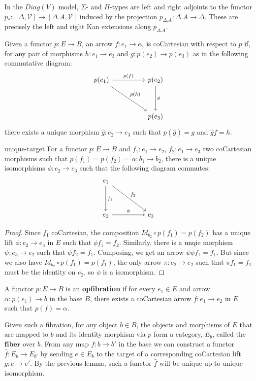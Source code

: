 \begin{rem}
In the $Diag(V)$ model, $\Sigma$- and $\Pi$-types are left and right adjoints to the functor $p_* : [\Delta, \mathcal{V}] \to [\Delta.A, \mathcal{V}]$ induced by the projection $p_{\Delta.A} : \Delta.A \to \Delta$. These are precisely the left and right Kan extensions along $p_{\Delta.A}$.
\end{rem}
\begin{defn}
Given a functor $p : E \to B$, an arrow $f : e_1 \to e_2$ is coCartesian with respect to $p$ if, for any pair of morphisms $h : e_1 \to e_3$ and $g : p(e_2) \to p(e_3)$ as in the following commutative diagram:
\[
\ti
p(e_1) \ar[r, "p(f)"] \ar[rd, "p(h)"] & p(e_2) \ar[d, "g"] \\
& p(e_3)
\kz
\]
there exists a unique morphism $\hat g : e_2 \to e_3$ such that $p(\hat g) = g$ and $\hat g f = h$.
\end{defn}
\begin{lem}{unique-target}
For a functor $p : E \to B$ and $f_1 : e_1 \to e_2$, $f_2 : e_1 \to e_3$ two coCartesian morphisms such that $p(f_1) = p(f_2) = \alpha : b_1 \to b_2$, there is a unique isomorphisms $\phi : e_2 \to e_3$ such that the following diagram commutes:
\[
\ti
e_1 \ar[d, "f_1"] \ar[rd, "f_2"] & \\
e_2 \ar[r,"\phi"] &  e_3
\kz
\]
\begin{proof}
Since $f_1$ coCartesian, the composition $Id_{b_2} \circ p(f_1) = p(f_2)$ has a unique lift $\phi : e_2 \to e_3$ in $E$ such that $\phi f_1 = f_2$. Similarly, there is a unqie morphism $\psi : e_3 \to e_2$ such that $\psi f_2 = f_1$. Composing, we get an arrow $\psi \phi f_1 = f_1$. But since we also have $Id_{b_2} \circ p(f_1) = p(f_1)$, the only arrow $\pi : e_2 \to e_2$ such that $\pi f_1 = f_1$ must be the identity on $e_2$, so $\phi$ is a isomorphism.
\end{proof}
\end{lem}
\begin{defn}[Opfibration]
A functor $p : E \to B$ is an \textbf{opfibration} if for every $e_1 \in E$ and arrow $\alpha : p(e_1) \to b$ in the base $B$, there exists a coCartesian arrow $f : e_1 \to e_2$ in $E$ such that $p(f) = \alpha$.
\end{defn}
Given such a fibration, for any object $b \in B$, the objects and morphisms of $E$ that are mapped to $b$ and its identity morphism via $p$ form a category, $E_b$, called the $\textbf{fiber}$ over $b$. From any map $f : b \to b'$ in the base we can construct a functor $\hat f : E_b \to E_{b'}$ by sending $e \in E_b$ to the target of a corresponding coCartesian lift $g : e \to e'$. By the previous lemma, such a functor $\hat f$ will be unique up to unique isomorphism.
